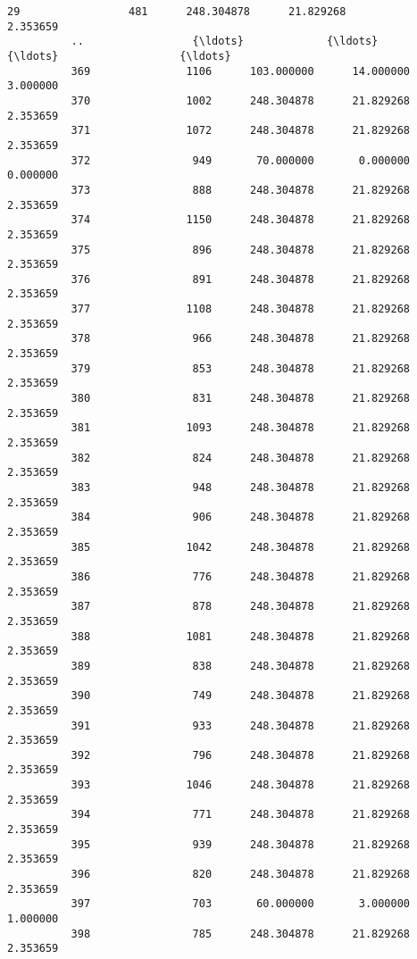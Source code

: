 \documentclass[11pt]{article}
\begin{document}
\begin{Verbatim}[commandchars=\\\{\}]
          29                 481      248.304878      21.829268              2.353659   
          ..                 {\ldots}             {\ldots}            {\ldots}                   {\ldots}   
          369               1106      103.000000      14.000000              3.000000   
          370               1002      248.304878      21.829268              2.353659   
          371               1072      248.304878      21.829268              2.353659   
          372                949       70.000000       0.000000              0.000000   
          373                888      248.304878      21.829268              2.353659   
          374               1150      248.304878      21.829268              2.353659   
          375                896      248.304878      21.829268              2.353659   
          376                891      248.304878      21.829268              2.353659   
          377               1108      248.304878      21.829268              2.353659   
          378                966      248.304878      21.829268              2.353659   
          379                853      248.304878      21.829268              2.353659   
          380                831      248.304878      21.829268              2.353659   
          381               1093      248.304878      21.829268              2.353659   
          382                824      248.304878      21.829268              2.353659   
          383                948      248.304878      21.829268              2.353659   
          384                906      248.304878      21.829268              2.353659   
          385               1042      248.304878      21.829268              2.353659   
          386                776      248.304878      21.829268              2.353659   
          387                878      248.304878      21.829268              2.353659   
          388               1081      248.304878      21.829268              2.353659   
          389                838      248.304878      21.829268              2.353659   
          390                749      248.304878      21.829268              2.353659   
          391                933      248.304878      21.829268              2.353659   
          392                796      248.304878      21.829268              2.353659   
          393               1046      248.304878      21.829268              2.353659   
          394                771      248.304878      21.829268              2.353659   
          395                939      248.304878      21.829268              2.353659   
          396                820      248.304878      21.829268              2.353659   
          397                703       60.000000       3.000000              1.000000   
          398                785      248.304878      21.829268              2.353659   
          

\end{Verbatim}
\end{document}
